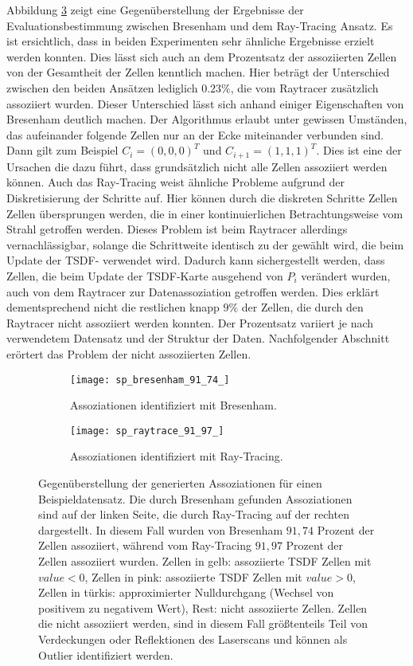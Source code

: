 Abbildung \ref{fig:bresenham_vs_raytrace} zeigt eine Gegenüberstellung der Ergebnisse der Evaluationsbestimmung zwischen Bresenham und dem Ray-Tracing Ansatz. Es ist ersichtlich, dass in beiden Experimenten sehr ähnliche Ergebnisse erzielt werden konnten. Dies lässt sich auch an dem Prozentsatz der assoziierten Zellen von der Gesamtheit der Zellen kenntlich machen. Hier beträgt der Unterschied zwischen den beiden Ansätzen lediglich $0.23 \%$, die vom Raytracer zusätzlich assoziiert wurden. Dieser Unterschied lässt sich anhand einiger Eigenschaften von Bresenham deutlich machen. Der Algorithmus erlaubt unter gewissen Umständen, das aufeinander folgende Zellen nur an der Ecke miteinander verbunden sind. Dann gilt zum Beispiel  $C_i = (0,0,0)^T$ und $C_{i+1} = (1,1,1)^T$. Dies ist eine der Ursachen die dazu führt, dass grundsätzlich nicht alle Zellen assoziiert werden können. Auch das Ray-Tracing weist ähnliche Probleme aufgrund der Diskretisierung der Schritte auf. Hier können durch die diskreten Schritte Zellen Zellen übersprungen werden, die in einer kontinuierlichen Betrachtungsweise vom Strahl getroffen werden. Dieses Problem ist beim Raytracer allerdings vernachlässigbar, solange die Schrittweite identisch zu der gewählt wird, die beim Update der TSDF- verwendet wird. Dadurch kann sichergestellt werden, dass Zellen, die beim Update der TSDF-Karte ausgehend von $P_i$ verändert wurden, auch von dem Raytracer zur Datenassoziation getroffen werden. Dies erklärt dementsprechend nicht die restlichen knapp $9\%$ der Zellen, die durch den Raytracer nicht assoziiert werden konnten. Der Prozentsatz variiert je nach verwendetem Datensatz und der Struktur der Daten. Nachfolgender Abschnitt erörtert das Problem der nicht assoziierten Zellen.


\begin{figure}
	\centering
	\begin{subfigure}{.5\textwidth}
 		 \centering
  		 \texttt{[image: sp\_bresenham\_91\_74\_]}
  		 \centering \caption{Assoziationen identifiziert mit Bresenham.}
  		 \label{fig:sp_bresenham}
	\end{subfigure}%
	\begin{subfigure}{.5\textwidth}
    	\centering
  		\texttt{[image: sp\_raytrace\_91\_97\_]}
  		\centering \caption{Assoziationen identifiziert mit Ray-Tracing.}
  		\label{fig:sp_raytrace}
	\end{subfigure}
	\caption{Gegenüberstellung der generierten Assoziationen für einen Beispieldatensatz. Die durch Bresenham gefunden Assoziationen sind auf der linken Seite, die durch Ray-Tracing auf der rechten dargestellt. In diesem Fall wurden von Bresenham $91,74$ Prozent der Zellen assoziiert, während vom Ray-Tracing $91,97$ Prozent der Zellen assoziiert wurden. Zellen in gelb: assoziierte TSDF Zellen mit $value < 0$, Zellen in pink: assoziierte TSDF Zellen mit $value > 0$, Zellen in türkis: approximierter Nulldurchgang (Wechsel von positivem zu negativem Wert), Rest: nicht assoziierte Zellen. Zellen die nicht assoziiert werden, sind in diesem Fall größtenteils Teil von Verdeckungen oder Reflektionen des Laserscans und können als Outlier identifiziert werden.}
	\label{fig:bresenham_vs_raytrace}
\end{figure}

